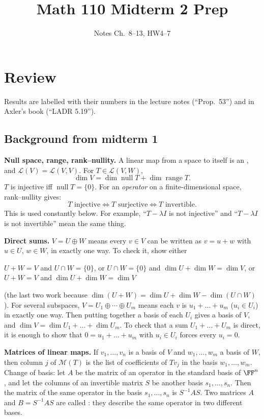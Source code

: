 \documentclass[10pt]{scrartcl}
\title{Math 110 Midterm 2 Prep}
\subtitle{Notes Ch.~8--13, HW4--7}
\author{}
\date{}
\DeclareMathOperator{\nul}{null}
\DeclareMathOperator{\range}{range}
\newcommand{\LL}{\mathcal L}
\newcommand{\MM}{\mathcal M}
\begin{document}
\maketitle

\section{Review}

Results are labelled with their numbers in the lecture notes (``Prop.~53'') and in Axler's book (``LADR 5.19'').

\subsection{Background from midterm 1}\label{sec:background}

\textbf{Null space, range, rank--nullity.} A linear map from a space to itself is an , and $\LL(V)=\LL(V,V)$. For $T\in\LL(V,W)$,
\[ \dim V=\dim\nul T+\dim\range T. \]
$T$ is injective iff $\nul T=\{0\}$. For an \emph{operator} on a finite-dimensional space, rank--nullity gives:
\[ T\text{ injective}\iff T\text{ surjective}\iff T\text{ invertible}. \]
This is used constantly below. For example, ``$T-\lambda I$ is not injective'' and ``$T-\lambda I$ is not invertible'' mean the same thing.

\textbf{Direct sums.} $V=U\oplus W$ means every $v\in V$ can be written as $v=u+w$ with $u\in U$, $w\in W$, in exactly one way. To check it, show either
\begin{itemize}
  \ii $U+W=V$ and $U\cap W=\{0\}$, or
  \ii $U\cap W=\{0\}$ and $\dim U+\dim W=\dim V$, or
  \ii $U+W=V$ and $\dim U+\dim W=\dim V$
\end{itemize}
(the last two work because $\dim(U+W)=\dim U+\dim W-\dim(U\cap W)$).
For several subspaces, $V=U_1\oplus\cdots\oplus U_m$ means each $v$ is $u_1+\dots+u_m$ ($u_i\in U_i$) in exactly one way. Then putting together a basis of each $U_i$ gives a basis of $V$, and $\dim V=\dim U_1+\dots+\dim U_m$. To check that a sum $U_1+\dots+U_m$ is direct, it is enough to show that $0=u_1+\dots+u_m$ with $u_i\in U_i$ forces every $u_i=0$.

\textbf{Matrices of linear maps.} If $v_1,\dots,v_n$ is a basis of $V$ and $w_1,\dots,w_m$ a basis of $W$, then column $j$ of $\MM(T)$ is the list of coefficients of $Tv_j$ in the basis $w_1,\dots,w_m$. Change of basis: let $A$ be the matrix of an operator in the standard basis of $\FF^n$, and let the columns of an invertible matrix $S$ be another basis $s_1,\dots,s_n$. Then the matrix of the same operator in the basis $s_1,\dots,s_n$ is $S^{-1}AS$. Two matrices $A$ and $B=S^{-1}AS$ are called : they describe the same operator in two different bases.
\end{document}
